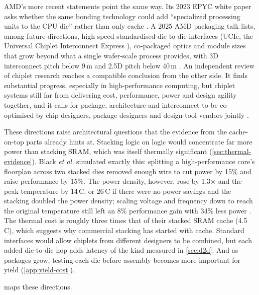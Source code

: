 AMD's more recent statements point the same way. Its 2023 EPYC white paper asks whether the same bonding technology could add ``specialized processing units to the CPU die'' rather than only cache \cite{advancedmicrodevicesinc.4thGenAMD2023}. A 2025 AMD packaging talk lists, among future directions, high-speed standardised die-to-die interfaces (UCIe, the Universal Chiplet Interconnect Express \cite{liuReviewChipletbasedDesign2024}), co-packaged optics and module sizes that grow beyond what a single wafer-scale process provides, with 3D interconnect pitch below 9\,\textmu m and 2.5D pitch below 40\,\textmu m \cite[slides~12--13]{lambertHeterogenousIntegrationHigh2025}. An independent review of chiplet research reaches a compatible conclusion from the other side. It finds substantial progress, especially in high-performance computing, but chiplet systems still far from delivering cost, performance, power and design agility together, and it calls for package, architecture and interconnect to be co-optimised by chip designers, package designers and design-tool vendors jointly \cite{liuReviewChipletbasedDesign2024}.

These directions raise architectural questions that the evidence from the cache-on-top parts already hints at. Stacking logic on logic would concentrate far more power than stacking SRAM, which was itself thermally significant (\cref{sec:thermal-evidence}). Black \emph{et al.} simulated exactly this: splitting a high-performance core's floorplan across two stacked dies removed enough wire to cut power by 15\% and raise performance by 15\%. The power density, however, rose by 1.3$\times$ and the peak temperature by 14\,\textdegree C, or 26\,\textdegree C if there were no power savings and the stacking doubled the power density; scaling voltage and frequency down to reach the original temperature still left an 8\% performance gain with 34\% less power \cite{blackStacking3DMicroarchitecture2006}. The thermal cost is roughly three times that of their stacked SRAM cache (4.5\,\textdegree C), which suggests why commercial stacking has started with cache. Standard interfaces would allow chiplets from different designers to be combined, but each added die-to-die hop adds latency of the kind measured in \cref{sec:d2d}. And as packages grow, testing each die before assembly becomes more important for yield (\cref{app:yield-cost}).

 maps these directions.

